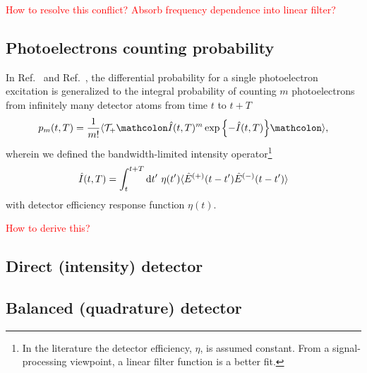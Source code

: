 \textcolor{red}{How to resolve this conflict? Absorb frequency dependence into linear filter?}

\subsection{Photoelectrons counting probability}

In Ref.~\cite[p.~725]{Mandel1995} and Ref.~\cite[p.~180]{Vogel2006}, the differential probability for a single photoelectron excitation is generalized to the integral probability of counting $m$ photoelectrons from infinitely many detector atoms from time $t$ to $t+T$
\begin{equation}
	p_m(t,T)
	=
	\frac{1}{m!}
	\expval{
		\mathcal{T}_+
		\norder{
			\hat{I}(t,T)^m
			\exp\left\{
				-\hat{I}(t,T)
			\right\}
		}
	}
	\label{eq:photoelectron_counting_prob}
	,	
\end{equation}
wherein we defined the bandwidth-limited intensity operator\footnote{In the literature the detector efficiency, $\eta$, is assumed constant. From a signal-processing viewpoint, a linear filter function is a better fit.}
\begin{align}
	\hat{I}(t,T)
	=
	\int_t^{t+T}\dd{t^\prime}
	\eta(t^\prime)
	\expval{
		\hat{E}^{(+)}(t-t^\prime)
		\hat{E}^{(-)}(t-t^\prime)
	}
\end{align}
with detector efficiency response function $\eta(t)$.

\textcolor{red}{How to derive this?}


\subsection{Direct (intensity) detector}


\subsection{Balanced (quadrature) detector}


